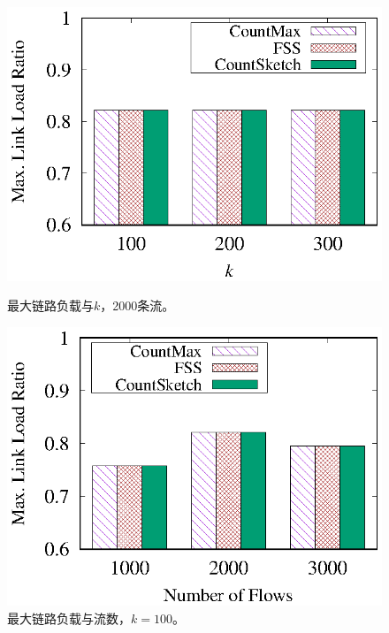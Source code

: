 \begin{figure}[!t]
	\centering
	\begin{minipage}[t]{0.48\linewidth}		
		\centering
		\includegraphics[width=\linewidth]{fig/proto_k_load_2000.eps}
		\caption{\textnormal{最大链路负载与$k$，2000条流。}}
		\label{fig:prototype,load,k}
	\end{minipage}\vspace{-0.6em}\hspace{0.4em}
	\begin{minipage}[t]{0.48\linewidth}
		\centering
		\includegraphics[width=\linewidth]{fig/proto_flow_load_200.eps}
		\caption{\textnormal{最大链路负载与流数，$k=100$。}}
		\label{fig:prototype,load,flow}
	\end{minipage}\vspace{-0.6em}
\end{figure}


